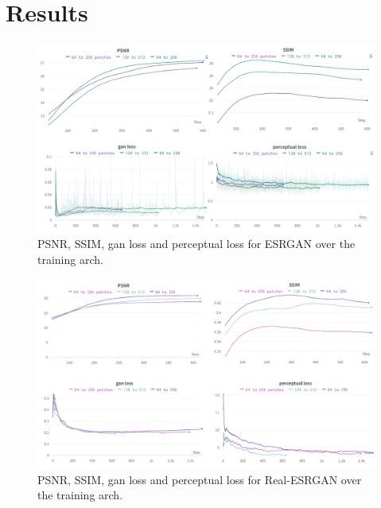 
\chapter{Results}
\label{cha:Results}


\begin{figure}[H]
  \centering
  \includegraphics[scale=0.8]{figures/ESRGAN_compose.png}
  \caption{PSNR, SSIM, gan loss and perceptual loss for ESRGAN over the training arch.}
  \label{img:esrgan_training}
\end{figure}

\begin{figure}[H]
  \centering
  \includegraphics[scale=0.8]{figures/RealESRGAN_compose.png}
  \caption{PSNR, SSIM, gan loss and perceptual loss for Real-ESRGAN over the training arch.}
  \label{img:realesrgan_training}
\end{figure}

